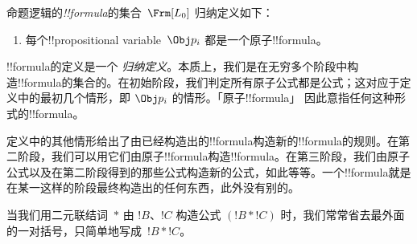 \documentclass[../../../include/open-logic-section]{subfiles}
\begin{document}
\begin{defn}[公式]
命题逻辑的\emph{!!{formula}}的集合~$\Frm[L_0]$ 归纳定义如下：
\begin{enumerate}


\item 每个!!{propositional variable}~$\Obj p_i$ 都是一个原子!!{formula}。






\end{enumerate}
\end{defn}

\begin{explain}
!!{formula}的定义是一个
\emph{归纳定义}。本质上，我们是在无穷多个阶段中构造!!{formula}的集合的。在初始阶段，我们判定所有原子公式都是公式；这对应于定义中的最初几个情形，即
%
%
$\Obj p_i$ 的情形。「原子!!{formula}」
因此意指任何这种形式的!!{formula}。

定义中的其他情形给出了由已经构造出的!!{formula}构造新的!!{formula}的规则。在第二阶段，我们可以用它们由原子!!{formula}构造!!{formula}。在第三阶段，我们由原子公式以及在第二阶段得到的那些公式构造新的公式，如此等等。一个!!{formula}就是在某一这样的阶段最终构造出的任何东西，此外没有别的。
\end{explain}

当我们用二元联结词~$\ast$ 由 $!B$、$!C$
构造公式 $(!B \ast !C)$ 时，我们常常省去最外面的一对括号，只简单地写成~$!B \ast !C$。
\end{document}
